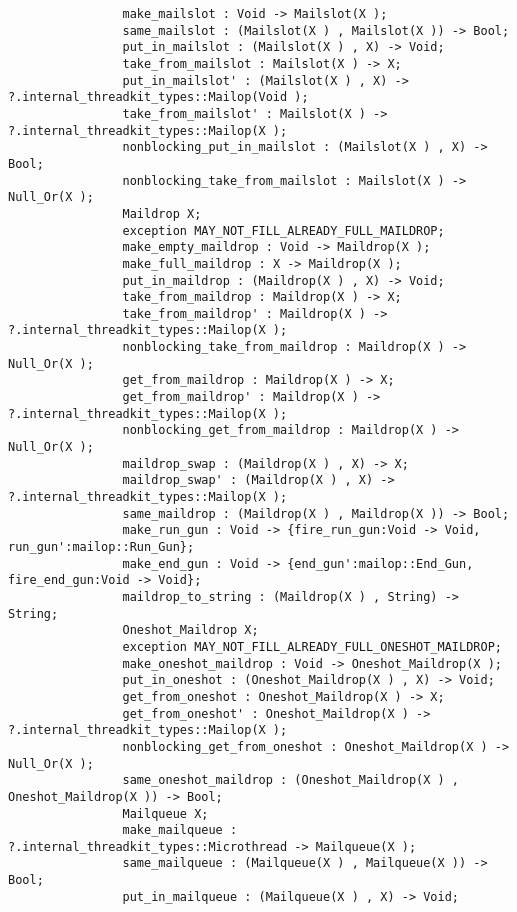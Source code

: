 \begin{verbatim}
                make_mailslot : Void -> Mailslot(X );
                same_mailslot : (Mailslot(X ) , Mailslot(X )) -> Bool;
                put_in_mailslot : (Mailslot(X ) , X) -> Void;
                take_from_mailslot : Mailslot(X ) -> X;
                put_in_mailslot' : (Mailslot(X ) , X) -> ?.internal_threadkit_types::Mailop(Void );
                take_from_mailslot' : Mailslot(X ) -> ?.internal_threadkit_types::Mailop(X );
                nonblocking_put_in_mailslot : (Mailslot(X ) , X) -> Bool;
                nonblocking_take_from_mailslot : Mailslot(X ) -> Null_Or(X );
                Maildrop X;
                exception MAY_NOT_FILL_ALREADY_FULL_MAILDROP;
                make_empty_maildrop : Void -> Maildrop(X );
                make_full_maildrop : X -> Maildrop(X );
                put_in_maildrop : (Maildrop(X ) , X) -> Void;
                take_from_maildrop : Maildrop(X ) -> X;
                take_from_maildrop' : Maildrop(X ) -> ?.internal_threadkit_types::Mailop(X );
                nonblocking_take_from_maildrop : Maildrop(X ) -> Null_Or(X );
                get_from_maildrop : Maildrop(X ) -> X;
                get_from_maildrop' : Maildrop(X ) -> ?.internal_threadkit_types::Mailop(X );
                nonblocking_get_from_maildrop : Maildrop(X ) -> Null_Or(X );
                maildrop_swap : (Maildrop(X ) , X) -> X;
                maildrop_swap' : (Maildrop(X ) , X) -> ?.internal_threadkit_types::Mailop(X );
                same_maildrop : (Maildrop(X ) , Maildrop(X )) -> Bool;
                make_run_gun : Void -> {fire_run_gun:Void -> Void, run_gun':mailop::Run_Gun};
                make_end_gun : Void -> {end_gun':mailop::End_Gun, fire_end_gun:Void -> Void};
                maildrop_to_string : (Maildrop(X ) , String) -> String;
                Oneshot_Maildrop X;
                exception MAY_NOT_FILL_ALREADY_FULL_ONESHOT_MAILDROP;
                make_oneshot_maildrop : Void -> Oneshot_Maildrop(X );
                put_in_oneshot : (Oneshot_Maildrop(X ) , X) -> Void;
                get_from_oneshot : Oneshot_Maildrop(X ) -> X;
                get_from_oneshot' : Oneshot_Maildrop(X ) -> ?.internal_threadkit_types::Mailop(X );
                nonblocking_get_from_oneshot : Oneshot_Maildrop(X ) -> Null_Or(X );
                same_oneshot_maildrop : (Oneshot_Maildrop(X ) , Oneshot_Maildrop(X )) -> Bool;
                Mailqueue X;
                make_mailqueue : ?.internal_threadkit_types::Microthread -> Mailqueue(X );
                same_mailqueue : (Mailqueue(X ) , Mailqueue(X )) -> Bool;
                put_in_mailqueue : (Mailqueue(X ) , X) -> Void;

\end{verbatim}
